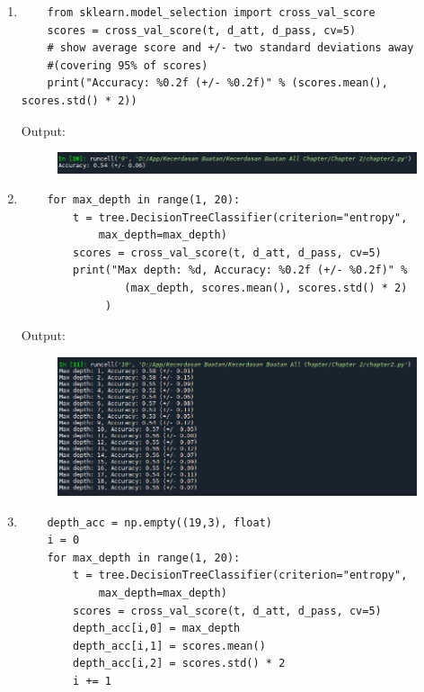 \begin{enumerate}
\item
\begin{verbatim}
	from sklearn.model_selection import cross_val_score
	scores = cross_val_score(t, d_att, d_pass, cv=5)
	# show average score and +/- two standard deviations away 
	#(covering 95% of scores)
	print("Accuracy: %0.2f (+/- %0.2f)" % (scores.mean(), scores.std() * 2))
\end{verbatim}
\newline Output: 
\begin{figure}[!htbp]
	\centering
	\includegraphics[scale=0.5]{figures/chapter2/9.PNG}
\end{figure}

\item 
\begin{verbatim}
	for max_depth in range(1, 20):
	    t = tree.DecisionTreeClassifier(criterion="entropy", 
			max_depth=max_depth)
	    scores = cross_val_score(t, d_att, d_pass, cv=5)
	    print("Max depth: %d, Accuracy: %0.2f (+/- %0.2f)" % 
				(max_depth, scores.mean(), scores.std() * 2)
			 )
\end{verbatim}
\newline Output: 
\newpage
\begin{figure}[!htbp]
	\centering
	\includegraphics[scale=0.5]{figures/chapter2/10.PNG}
\end{figure}

\item
\begin{verbatim}
	depth_acc = np.empty((19,3), float)
	i = 0
	for max_depth in range(1, 20):
	    t = tree.DecisionTreeClassifier(criterion="entropy", 
			max_depth=max_depth)
	    scores = cross_val_score(t, d_att, d_pass, cv=5)
	    depth_acc[i,0] = max_depth
	    depth_acc[i,1] = scores.mean()
	    depth_acc[i,2] = scores.std() * 2
	    i += 1


\end{verbatim}
\end{enumerate}

